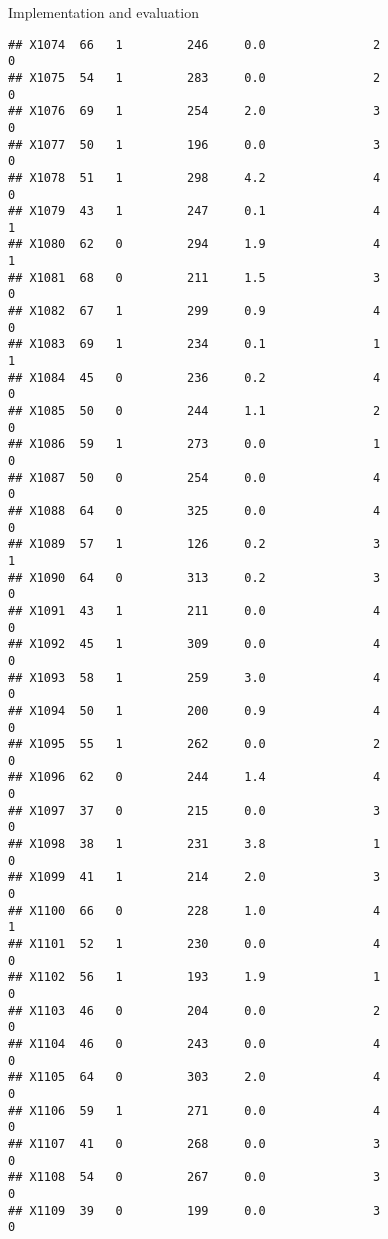 \documentclass[
  ignorenonframetext,
]{beamer}
\begin{document}
\begin{frame}[fragile]{Implementation and evaluation}
\begin{verbatim}
## X1074  66   1         246     0.0               2                   0
## X1075  54   1         283     0.0               2                   0
## X1076  69   1         254     2.0               3                   0
## X1077  50   1         196     0.0               3                   0
## X1078  51   1         298     4.2               4                   0
## X1079  43   1         247     0.1               4                   1
## X1080  62   0         294     1.9               4                   1
## X1081  68   0         211     1.5               3                   0
## X1082  67   1         299     0.9               4                   0
## X1083  69   1         234     0.1               1                   1
## X1084  45   0         236     0.2               4                   0
## X1085  50   0         244     1.1               2                   0
## X1086  59   1         273     0.0               1                   0
## X1087  50   0         254     0.0               4                   0
## X1088  64   0         325     0.0               4                   0
## X1089  57   1         126     0.2               3                   1
## X1090  64   0         313     0.2               3                   0
## X1091  43   1         211     0.0               4                   0
## X1092  45   1         309     0.0               4                   0
## X1093  58   1         259     3.0               4                   0
## X1094  50   1         200     0.9               4                   0
## X1095  55   1         262     0.0               2                   0
## X1096  62   0         244     1.4               4                   0
## X1097  37   0         215     0.0               3                   0
## X1098  38   1         231     3.8               1                   0
## X1099  41   1         214     2.0               3                   0
## X1100  66   0         228     1.0               4                   1
## X1101  52   1         230     0.0               4                   0
## X1102  56   1         193     1.9               1                   0
## X1103  46   0         204     0.0               2                   0
## X1104  46   0         243     0.0               4                   0
## X1105  64   0         303     2.0               4                   0
## X1106  59   1         271     0.0               4                   0
## X1107  41   0         268     0.0               3                   0
## X1108  54   0         267     0.0               3                   0
## X1109  39   0         199     0.0               3                   0

\end{verbatim}
\end{frame}
\end{document}
